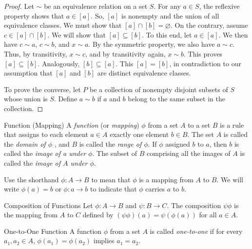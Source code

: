 \documentclass[../butidigress.tex]{subfiles}
\begin{document}
\begin{proof}
Let $\sim$ be an equivalence relation on a set $S$.
For any $a \in S$, the reflexive property shows that $a \in [a]$.
So, $[a]$ is nonempty and the union of all equivalence classes.
We must show that $[a] \cap [b] = \varnothing$.
On the contrary, assume $c \in [a] \cap [b]$.
We will show that $[a] \subseteq [b]$.
To this end, let $a \in [a]$.
We then have $c \sim a$, $c \sim b$, and $x \sim a$.
By the symmetric property, we also have $a \sim c$.
Thus, by transitivity, $x \sim c$, and by transitivity again, $x \sim b$.
This proves $[a] \subseteq [b]$.
Analogously, $[b] \subseteq [a]$.
This $[a] = [b]$, in contradiction to our assumption that $[a]$ and $[b]$ are distinct equivalence classes.

To prove the converse, let $P$ be a collection of nonempty disjoint subsets of $S$ whose union is $S$.
Define $a \sim b$ if $a$ and $b$ belong to the same subset in the collection.
\end{proof}


\begin{definition}{Function (Mapping)}
A \emph{function} (or \emph{mapping}) $\phi$ from a set $A$ to a set $B$ is a rule that assigns to each element $a \in A$ exactly one element $b \in B$.
The set $A$ is called the \emph{domain of $\phi$} , and $B$ is called the \emph{range of $\phi$}.
If $\phi$ assigned $b$ to $a$, then $b$ is called the \emph{image of a under $\phi$}.
The subset of $B$ comprising all the images of $A$ is called the \emph{image of $A$ under $\phi$}.
\end{definition}

Use the shorthand $\phi: A\rightarrow B$ to mean that $\phi$ is a mapping from $A$ to $B$.
We will write $\phi(a) = b$ or $\phi : a \rightarrow b$ to indicate that $\phi$ carries $a$ to $b$.

\begin{definition}{Composition of Functions}
Let $\phi : A\rightarrow B$ and $\psi : B\rightarrow C$.
The composition $\psi\phi$ is the mapping from $A$ to $C$ defined by $(\psi\phi)(a) = \psi(\phi(a))$ for all $a \in A$.
\end{definition}

\begin{definition}{One-to-One Function}
A function $\phi$ from a set $A$ is called \emph{one-to-one} if for every $a_{1},a_{2} \in A$, $\phi(a_{1}) = \phi(a_{2})$ implies $a_{1} = a_{2}$.
\end{definition}
\end{document}
